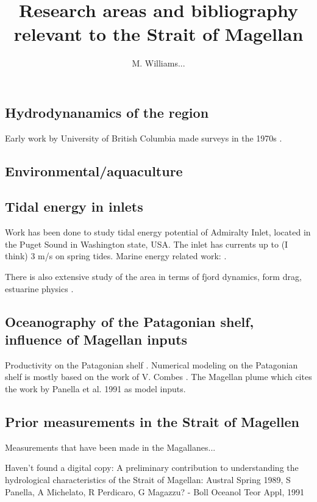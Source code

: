 \documentclass[11pt, oneside]{article}   	%
\title{Research areas and bibliography relevant to the Strait of Magellan}
\author{M. Williams...}
\begin{document}
\maketitle

\subsection{Hydrodynanamics of the region} 

Early work by University of British Columbia made surveys in the 1970s \cite{ppickard71}.

\subsection{Environmental/aquaculture}

\citep{niklitschek13}

\subsection*{Tidal energy in inlets}

Work has been done to study tidal energy potential of Admiralty Inlet, located in the Puget Sound in Washington state, USA. The inlet has currents up to (I think) 3 m/s on spring tides. Marine energy related work: \citep{polagye13, kawasethyng10, thomson12, polagye09}. 

There is also extensive study of the area in terms of fjord dynamics, form drag, estuarine physics \citep[e.g.][]{warner13, geyer82}.


\subsection*{Oceanography of the Patagonian shelf, influence of Magellan inputs}
Productivity on the Patagonian shelf \citep{song16}. Numerical modeling on the Patagonian shelf is mostly based on the work of V. Combes \citep{combes14}. The Magellan plume \citep{palma12} which cites the work by Panella et al. 1991 as model inputs.

\subsection*{Prior measurements in the Strait of Magellen}
Measurements that have been made in the Magallanes... \citep{antezana99}

Haven't found a digital copy: A preliminary contribution to understanding the hydrological characteristics of the Strait of Magellan: Austral Spring 1989, S Panella, A Michelato, R Perdicaro, G Magazzu? - Boll Oceanol Teor Appl, 1991

{}

\end{document}
